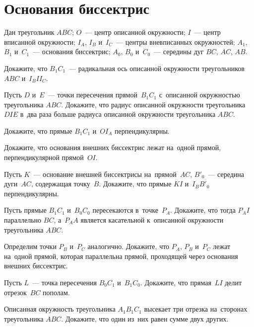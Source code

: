 
\section*{Основания биссектрис}


Дан треугольник $ABC$;
$O$~--- центр описанной окружности;
$I$~--- центр вписанной окружности;
$I_A$, $I_B$ и~$I_C$~--- центры вневписанных окружностей;
$A_1$, $B_1$ и~$C_1$~--- основания биссектрис;
$A_0$, $B_0$ и~$C_0$~--- середины дуг $BC$, $AC$, $AB$.

\begin{problems}

\item
Докажите, что $B_1 C_1$~--- радикальная ось описанной окружности треугольников
$ABC$ и~$I_B I I_C$. 

\item
Пусть $D$ и~$E$~--- точки пересечения прямой~$B_1 C_1$ с~описанной окружностью
треугольника $ABC$.
Докажите, что радиус описанной окружности треугольника $DIE$ в~два раза больше
радиуса описанной окружности треугольника $ABC$.

\item
Докажите, что прямые $B_1 C_1$ и~$O I_A$ перпендикулярны.

\item
Докажите, что основания внешних биссектрис лежат на~одной прямой,
перпендикулярной прямой~$OI$.

\item
Пусть $K$~--- основание внешней биссектрисы на~прямой~$AC$, $B'_0$~--- середина
дуги~$AC$, содержащая точку~$B$.
Докажите, что прямые $KI$ и~$I_B B'_0$ перпендикулярны.

\item
Пусть прямые $B_1 C_1$ и~$B_0 C_0$ пересекаются в~точке~$P_A$.
Докажите, что тогда $P_A I$ параллельно $BC$, а~$P_A A$ является касательной
к~описанной окружности треугольника $ABC$.

\item
Определим точки $P_B$ и~$P_C$ аналогично.
Докажите, что $P_A$, $P_B$ и~$P_C$ лежат на~одной прямой, которая параллельна
прямой, проходящей через основания внешних биссектрис.

\item
Пусть $L$~--- точка пересечения $B_0 C_1$ и~$B_1 C_0$.
Докажите, что прямая~$LI$ делит отрезок~$BC$ пополам.

\item
Описанная окружность треугольника $A_1 B_1 C_1$ высекает три отрезка
на~сторонах треугольника $ABC$.
Докажите, что один из~них равен сумме двух других.

\end{problems}

